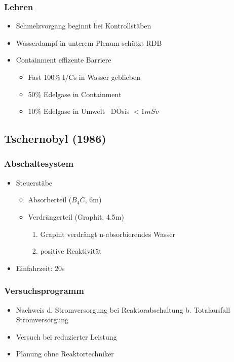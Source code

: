 \documentclass[12pt]{article}
\begin{document}
\subsubsection{Lehren}
\begin{itemize}
  \item Schmelzvorgang beginnt bei Kontrollstäben
  \item Wasserdampf in unterem Plenum schützt RDB
  \item Containment effizente Barriere
  \begin{itemize}
    \item Fast 100\% I/Cs in Wasser geblieben
    \item 50\% Edelgase in Containment
    \item 10\% Edelgase in Umwelt \textrightarrow\ DOsis \(<1 mSv\)
  \end{itemize}
\end{itemize}

\subsection{Tschernobyl (1986)}

\subsubsection{Abschaltesystem}
\begin{itemize}
  \item Steuerstäbe
  \begin{itemize}
    \item Absorberteil (\(B_4C\), 6m)
    \item Verdrängerteil (Graphit, 4.5m)
    \begin{enumerate}[label = \textrightarrow]
    \item Graphit verdrängt n-absorbierendes Wasser
    \item positive Reaktivität
    \end{enumerate}
  \end{itemize}
  \item Einfahrzeit: 20s
\end{itemize}

\subsubsection{Versuchsprogramm}
\begin{itemize}
  \item Nachweis d. Stromversorgung bei Reaktorabschaltung b. Totalausfall Stromversorgung
  \item Versuch bei reduzierter Leistung
  \item Planung ohne Reaktortechniker
\end{itemize}
\end{document}
